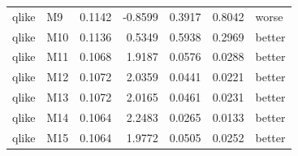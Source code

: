 \begin{tabular}{llrrrrl}
qlike & M9 & 0.1142 & -0.8599 & 0.3917 & 0.8042 & worse \\
qlike & M10 & 0.1136 & 0.5349 & 0.5938 & 0.2969 & better \\
qlike & M11 & 0.1068 & 1.9187 & 0.0576 & 0.0288 & better \\
qlike & M12 & 0.1072 & 2.0359 & 0.0441 & 0.0221 & better \\
qlike & M13 & 0.1072 & 2.0165 & 0.0461 & 0.0231 & better \\
qlike & M14 & 0.1064 & 2.2483 & 0.0265 & 0.0133 & better \\
qlike & M15 & 0.1064 & 1.9772 & 0.0505 & 0.0252 & better \\
\bottomrule
\end{tabular}
